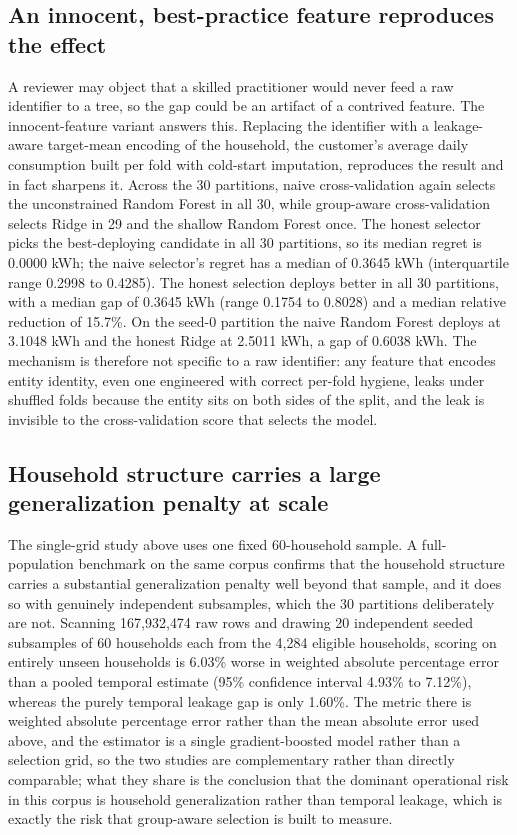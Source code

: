 \documentclass[10pt]{article}
\begin{document}
\subsection{An innocent, best-practice feature reproduces the effect}

A reviewer may object that a skilled practitioner would never feed a raw
identifier to a tree, so the gap could be an artifact of a contrived feature. The
innocent-feature variant answers this. Replacing the identifier with a
leakage-aware target-mean encoding of the household, the customer's average daily
consumption built per fold with cold-start imputation, reproduces the result and
in fact sharpens it. Across the 30 partitions, naive cross-validation again
selects the unconstrained Random Forest in all 30, while group-aware
cross-validation selects Ridge in 29 and the shallow Random Forest once. The
honest selector picks the best-deploying candidate in all 30 partitions, so its
median regret is 0.0000 kWh; the naive selector's regret has a median of 0.3645
kWh (interquartile range 0.2998 to 0.4285). The honest selection deploys better
in all 30 partitions, with a median gap of 0.3645 kWh (range 0.1754 to 0.8028)
and a median relative reduction of 15.7\%. On the seed-0 partition the naive
Random Forest deploys at 3.1048 kWh and the honest Ridge at 2.5011 kWh, a gap of
0.6038 kWh. The mechanism is therefore not specific to a raw identifier: any
feature that encodes entity identity, even one engineered with correct per-fold
hygiene, leaks under shuffled folds because the entity sits on both sides of the
split, and the leak is invisible to the cross-validation score that selects the
model.

\subsection{Household structure carries a large generalization penalty at scale}
\label{subsec:population}

The single-grid study above uses one fixed 60-household sample. A full-population
benchmark on the same corpus confirms that the household structure carries a
substantial generalization penalty well beyond that sample, and it does so with
genuinely independent subsamples, which the 30 partitions deliberately are not.
Scanning 167{,}932{,}474 raw rows and drawing 20 independent seeded subsamples of
60 households each from the 4{,}284 eligible households, scoring on entirely
unseen households is 6.03\% worse in weighted absolute percentage error than a
pooled temporal estimate (95\% confidence interval 4.93\% to 7.12\%), whereas the
purely temporal leakage gap is only 1.60\%. The metric there is weighted absolute
percentage error rather than the mean absolute error used above, and the
estimator is a single gradient-boosted model rather than a selection grid, so the
two studies are complementary rather than directly comparable; what they share is
the conclusion that the dominant operational risk in this corpus is household
generalization rather than temporal leakage, which is exactly the risk that
group-aware selection is built to measure.
\end{document}
